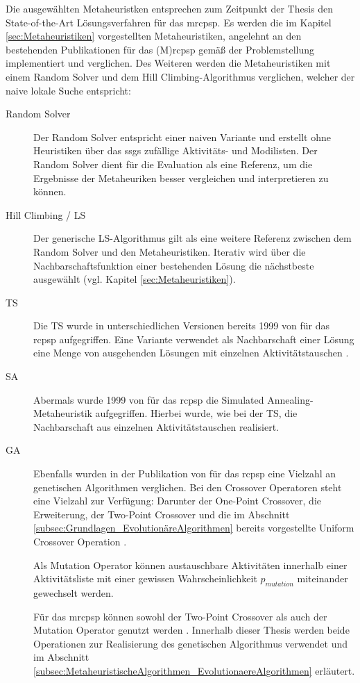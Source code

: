 Die ausgewählten Metaheuristken entsprechen zum Zeitpunkt der Thesis den State-of-the-Art Lösungsverfahren für das \ac{mrcpsp}. Es werden die im Kapitel \ref{sec:Metaheuristiken} vorgestellten Metaheuristiken, angelehnt an den bestehenden Publikationen für das (M)\ac{rcpsp} gemäß der Problemstellung implementiert und verglichen. Des Weiteren werden die Metaheuristiken mit einem Random Solver und dem Hill Climbing-Algorithmus verglichen, welcher der naive lokale Suche entspricht:

\begin{description}
\item[Random Solver] Der Random Solver entspricht einer naiven Variante und erstellt ohne Heuristiken über das \ac{ssgs} zufällige Aktivitäts- und Modilisten. Der Random Solver dient für die Evaluation als eine Referenz, um die Ergebnisse der Metaheuriken besser vergleichen und interpretieren zu können. 

\item[Hill Climbing / \acf{LS}] Der generische \ac{LS}-Algorithmus gilt als eine weitere Referenz zwischen dem Random Solver und den Metaheuristiken. Iterativ wird über die Nachbarschaftsfunktion einer bestehenden Lösung die nächstbeste ausgewählt (vgl. Kapitel \ref{sec:Metaheuristiken}).  

\item[\acf{TS}] Die \ac{TS} wurde in unterschiedlichen Versionen bereits 1999 von \cite[S. 9]{kolisch_heuristic_1998} für das \ac{rcpsp} aufgegriffen. Eine Variante verwendet als Nachbarschaft einer Lösung eine Menge von ausgehenden Lösungen mit einzelnen Aktivitätstauschen \cite[vgl.][S. 5]{thomas_tabu_1998}. 

\item[\acf{SA}] Abermals wurde 1999 von \cite[S. 9]{kolisch_heuristic_1998} für das \ac{rcpsp} die Simulated Annealing-Metaheuristik aufgegriffen. Hierbei wurde, wie bei der \ac{TS}, die Nachbarschaft aus einzelnen Aktivitätstauschen realisiert. 

\item[\acf{GA}] Ebenfalls wurden in der Publikation von \cite[S. 9]{kolisch_heuristic_1998} für das \ac{rcpsp} eine Vielzahl an genetischen Algorithmen verglichen. Bei den Crossover Operatoren steht eine Vielzahl zur Verfügung: Darunter der One-Point Crossover, die Erweiterung, der Two-Point Crossover und die im Abschnitt \ref{subsec:Grundlagen_EvolutionäreAlgorithmen} bereits vorgestellte Uniform Crossover Operation \cite[vgl.][S. 4 f.]{hartmann_competitive_1998}. 

Als Mutation Operator können austauschbare Aktivitäten innerhalb einer Aktivitätsliste mit einer gewissen Wahrscheinlichkeit $p_{mutation}$ miteinander gewechselt werden. \cite[vgl.][S. 5]{hartmann_competitive_1998} 

Für das \ac{mrcpsp} können sowohl der Two-Point Crossover als auch der Mutation Operator genutzt werden \cite[vgl. ][S. 10 ff.]{rezaeian_using_2015}. Innerhalb dieser Thesis werden beide Operationen zur Realisierung des genetischen Algorithmus verwendet und im Abschnitt \ref{subsec:MetaheuristischeAlgorithmen_EvolutionaereAlgorithmen} erläutert.
\end{description}

